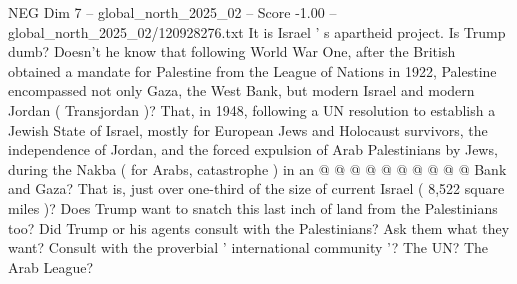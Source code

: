 \begin{textsample}{NEG Dim 7 – global\_north\_2025\_02 – Score -1.00 – global\_north\_2025\_02/120928276.txt}
It is Israel ' s apartheid project.
Is Trump dumb?
Doesn't he know that following World War One, after the British obtained a mandate for Palestine from the League of Nations in 1922, Palestine encompassed not only Gaza, the West Bank, but modern Israel and modern Jordan ( Transjordan )?
That, in 1948, following a UN resolution to establish a Jewish State of Israel, mostly for European Jews and Holocaust survivors, the independence of Jordan, and the forced expulsion of Arab Palestinians by Jews, during the Nakba ( for Arabs, catastrophe ) in an @ @ @ @ @ @ @ @ @ @ Bank and Gaza?
That is, just over one-third of the size of current Israel ( 8,522 square miles )?
Does Trump want to snatch this last inch of land from the Palestinians too?
Did Trump or his agents consult with the Palestinians?
Ask them what they want?
Consult with the proverbial ' international community '?
The UN?
The Arab League?

\end{textsample}
